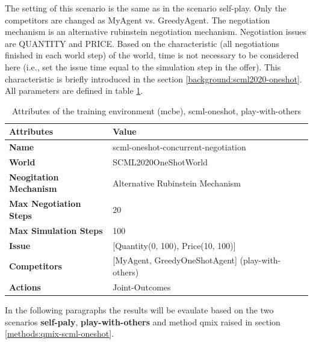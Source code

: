 The setting of this scenario is the same as in the scenario self-play. Only the competitors are changed as MyAgent vs. GreedyAgent. The negotiation mechanism is an alternative rubinstein negotiation mechanism. Negotiation issues are QUANTITY and PRICE. Based on the characteristic (all negotiations finished in each world step) of the world, time is not necessary to be considered here (i.e., set the issue time equal to the simulation step in the offer). This characteristic is briefly introduced in the section \ref{background:scml2020-oneshot}. 
All parameters are defined in table \ref{tab:attributes-mcbe-concurrent-negotiation-scml-oneshot-with-others}.

\begin{table}[htbp]
\centering
\begin{tabular}{l l l} \toprule
\bfseries \textbf{Attributes}    & \bfseries \textbf{Value}                                             \\ \midrule
\textbf{Name}                    & scml-oneshot-concurrent-negotiation                                  \\
\textbf{World}                   & SCML2020OneShotWorld                                                 \\
\textbf{Neogitation Mechanism}   & Alternative Rubinstein Mechanism                                                         \\
\textbf{Max Negotiation Steps}   & 20                                                                  \\
\textbf{Max Simulation Steps}    & 100                                                                   \\
\textbf{Issue}             	     & [Quantity(0, 100), Price(10, 100)]                     \\
\textbf{Competitors}             & [MyAgent, GreedyOneShotAgent] (play-with-others)                                       \\
\textbf{Actions}                 & Joint-Outcomes                                                             \\
\bottomrule
\end{tabular}
\caption{Attributes of the training environment (mcbe), scml-oneshot, play-with-others}
\label{tab:attributes-mcbe-concurrent-negotiation-scml-oneshot-with-others}
\end{table}

In the following paragraphs the results will be evaulate based on the two scenarios \textbf{self-paly},\textbf{ play-with-others} and method qmix raised in section \ref{methods:qmix-scml-oneshot}.


